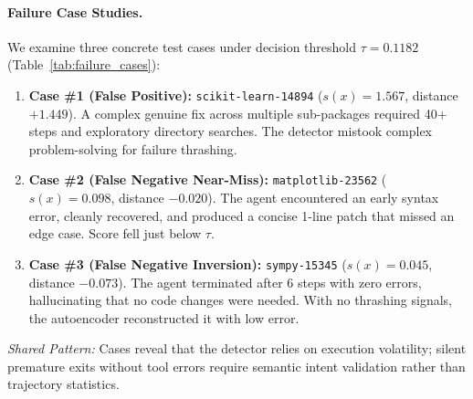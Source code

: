 \documentclass[11pt]{article}
\begin{document}
\paragraph{Failure Case Studies.}
We examine three concrete test cases under decision threshold $\tau = 0.1182$ (Table~\ref{tab:failure_cases}):
\begin{enumerate}
    \item \textbf{Case \#1 (False Positive):} \texttt{scikit-learn-14894} ($s(x)=1.567$, distance $+1.449$). A complex genuine fix across multiple sub-packages required 40+ steps and exploratory directory searches. The detector mistook complex problem-solving for failure thrashing.
    \item \textbf{Case \#2 (False Negative Near-Miss):} \texttt{matplotlib-23562} ($s(x)=0.098$, distance $-0.020$). The agent encountered an early syntax error, cleanly recovered, and produced a concise 1-line patch that missed an edge case. Score fell just below $\tau$.
    \item \textbf{Case \#3 (False Negative Inversion):} \texttt{sympy-15345} ($s(x)=0.045$, distance $-0.073$). The agent terminated after 6 steps with zero errors, hallucinating that no code changes were needed. With no thrashing signals, the autoencoder reconstructed it with low error.
\end{enumerate}
\textit{Shared Pattern:} Cases reveal that the detector relies on execution volatility; silent premature exits without tool errors require semantic intent validation rather than trajectory statistics.

\begin{table}[t]
\centering
\footnotesize
{}
\vspace{-2mm}
\caption{Concrete test set failure case studies under validation threshold $\tau = 0.1182$.}
\label{tab:failure_cases}
\vspace{-2mm}
\end{table}
\end{document}
